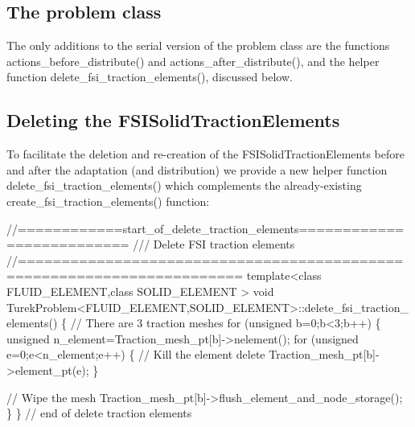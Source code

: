 \hypertarget{index_problem_class}{}\subsection{The problem class}\label{index_problem_class}
The only additions to the serial version of the problem class are the functions {\ttfamily actions\+\_\+before\+\_\+distribute()} and {\ttfamily actions\+\_\+after\+\_\+distribute()}, and the helper function {\ttfamily delete\+\_\+fsi\+\_\+traction\+\_\+elements()}, discussed below.



\hypertarget{index_delete_fsi}{}\subsection{Deleting the F\+S\+I\+Solid\+Traction\+Elements}\label{index_delete_fsi}
To facilitate the deletion and re-\/creation of the {\ttfamily F\+S\+I\+Solid\+Traction\+Elements} before and after the adaptation (and distribution) we provide a new helper function {\ttfamily delete\+\_\+fsi\+\_\+traction\+\_\+elements()} which complements the already-\/existing {\ttfamily create\+\_\+fsi\+\_\+traction\+\_\+elements()} function\+:

 
\begin{DoxyCodeInclude}
\textcolor{comment}{//============start\_of\_delete\_traction\_elements==========================}
\textcolor{comment}{/// Delete FSI traction elements }
\textcolor{comment}{}\textcolor{comment}{//=======================================================================}
\textcolor{keyword}{template}<\textcolor{keyword}{class} FLUID\_ELEMENT,\textcolor{keyword}{class} SOLID\_ELEMENT >
\textcolor{keywordtype}{void} TurekProblem<FLUID\_ELEMENT,SOLID\_ELEMENT>::delete\_fsi\_traction\_elements()
\{
 \textcolor{comment}{// There are 3 traction meshes}
 \textcolor{keywordflow}{for} (\textcolor{keywordtype}{unsigned} b=0;b<3;b++)
  \{
   \textcolor{keywordtype}{unsigned} n\_element=Traction\_mesh\_pt[b]->nelement();
   \textcolor{keywordflow}{for} (\textcolor{keywordtype}{unsigned} e=0;e<n\_element;e++)
    \{
     \textcolor{comment}{// Kill the element}
     \textcolor{keyword}{delete} Traction\_mesh\_pt[b]->element\_pt(e);
    \}

   \textcolor{comment}{// Wipe the mesh}
   Traction\_mesh\_pt[b]->flush\_element\_and\_node\_storage();
  \}
\} \textcolor{comment}{// end of delete traction elements}

\end{DoxyCodeInclude}




